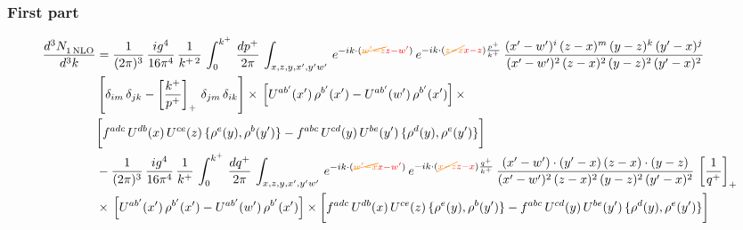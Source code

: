 \documentclass[9pt]{article}
\numberwithin{equation}{section}
\begin{document}
\subsubsection*{First part}
\begin{align}
     \frac{d^{3}N_{1\,\rm NLO}^{\rm}}{d^{3}k}  & =  \frac{1}{(2\pi)^{3}}\, \frac{ig^{4}}{16\pi^{4}}\, \frac{1}{k^{+\,2}}\,\int_{0}^{k^{+}}\, \frac{dp^{+}}{2\pi}\,\int_{x,z,y,x',y'w'}\,e^{-ik\cdot ({\color{orange}\cancel{w^\prime-z}}{\color{red}z-w^\prime})}\,e^{-ik\cdot ({\color{orange}\cancel{z-x}}{\color{red}x-z})\frac{p^{+}}{k^{+}}}\,\frac{(x'-w')^{i}\,(z-x)^{m}\,(y-z)^{k}\,(y'-x)^{j}}{(x'-w')^{2}\,(z-x)^{2}\,(y-z)^{2}\,(y'-x)^{2}}\,\notag \\ & \left[\delta_{im}\,\delta_{jk}-\left[\frac{k^{+}}{p^{+}}\right]_{+}\, \delta_{jm}\,\delta_{ik}\right]\times\, \left[U^{ab'}(x')\,\rho^{b'}(x')-U^{ab'}(w')\,\rho^{b'}(x')\right]\times\notag \\ & \bigg[f^{adc}\,U^{db}(x)\,U^{ce}(z)\, \{\rho^{e}(y),\rho^{b}(y')\}-f^{abc}\,U^{cd}(y)\,U^{be}(y')\, \{\rho^{d}(y),\rho^{e}(y')\}\bigg] \notag \\ & -\frac{1}{(2\pi)^{3}}\, \frac{ig^{4}}{16\pi^{4}}\, \frac{1}{k^{+}}\,\int_{0}^{k^{+}}\, \frac{dq^{+}}{2\pi}\,\int_{x,z,y,x',y'w'}\,e^{-ik\cdot ({\color{orange}\cancel{w^\prime-x}}{\color{red}x-w^\prime})}\,e^{-ik\cdot ({\color{orange}\cancel{x-z}}{\color{red}z-x})\frac{q^{+}}{k^{+}}}\,\frac{(x'-w')\cdot (y'-x)\,(z-x)\cdot (y-z)}{(x'-w')^{2}\,(z-x)^{2}\,(y-z)^{2}\,(y'-x)^{2}}\,\left[\frac{1}{q^{+}}\right]_{+}\notag \\ & \times\, \left[U^{ab'}(x')\,\rho^{b'}(x')-U^{ab'}(w')\,\rho^{b'}(x')\right]\times \bigg[f^{adc}\,U^{db}(x)\,U^{ce}(z)\, \{\rho^{e}(y),\rho^{b}(y')\}-f^{abc}\,U^{cd}(y)\,U^{be}(y')\, \{\rho^{d}(y),\rho^{e}(y')\}\bigg]
\end{align}
\end{document}
